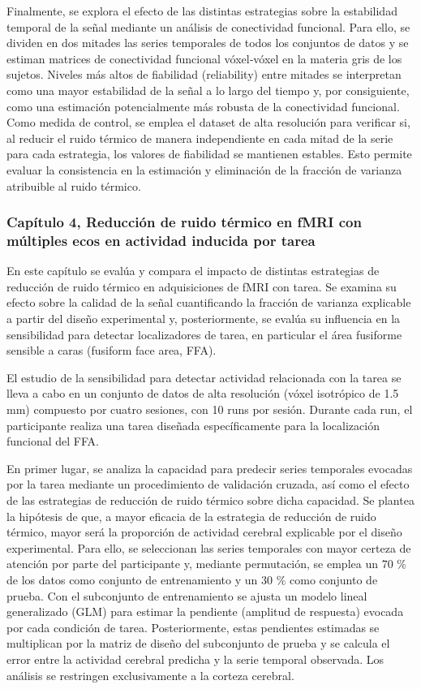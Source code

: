 Finalmente, se explora el efecto de las distintas estrategias sobre la estabilidad temporal de la señal mediante un análisis de conectividad funcional. Para ello, se dividen en dos mitades las series temporales de todos los conjuntos de datos y se estiman matrices de conectividad funcional vóxel‑vóxel en la materia gris de los sujetos. Niveles más altos de fiabilidad (reliability) entre mitades se interpretan como una mayor estabilidad de la señal a lo largo del tiempo y, por consiguiente, como una estimación potencialmente más robusta de la conectividad funcional. Como medida de control, se emplea el dataset de alta resolución para verificar si, al reducir el ruido térmico de manera independiente en cada mitad de la serie para cada estrategia, los valores de fiabilidad se mantienen estables. Esto permite evaluar la consistencia en la estimación y eliminación de la fracción de varianza atribuible al ruido térmico.


\subsubsection{Capítulo 4, Reducción de ruido térmico en fMRI  con múltiples ecos en actividad inducida por tarea}

En este capítulo se evalúa y compara el impacto de distintas estrategias de reducción de ruido térmico en adquisiciones de fMRI con tarea. Se examina su efecto sobre la calidad de la señal cuantificando la fracción de varianza explicable a partir del diseño experimental y, posteriormente, se evalúa su influencia en la sensibilidad para detectar localizadores de tarea, en particular el área fusiforme sensible a caras (fusiform face area, FFA).

El estudio de la sensibilidad para detectar actividad relacionada con la tarea se lleva a cabo en un conjunto de datos de alta resolución (vóxel isotrópico de 1.5 mm) compuesto por cuatro sesiones, con 10 runs por sesión. Durante cada run, el participante realiza una tarea diseñada específicamente para la localización funcional del FFA.

En primer lugar, se analiza la capacidad para predecir series temporales evocadas por la tarea mediante un procedimiento de validación cruzada, así como el efecto de las estrategias de reducción de ruido térmico sobre dicha capacidad. Se plantea la hipótesis de que, a mayor eficacia de la estrategia de reducción de ruido térmico, mayor será la proporción de actividad cerebral explicable por el diseño experimental. Para ello, se seleccionan las series temporales con mayor certeza de atención por parte del participante y, mediante permutación, se emplea un 70 $\%$ de los datos como conjunto de entrenamiento y un 30 $\%$ como conjunto de prueba. Con el subconjunto de entrenamiento se ajusta un modelo lineal generalizado (GLM) para estimar la pendiente (amplitud de respuesta) evocada por cada condición de tarea. Posteriormente, estas pendientes estimadas se multiplican por la matriz de diseño del subconjunto de prueba y se calcula el error entre la actividad cerebral predicha y la serie temporal observada. Los análisis se restringen exclusivamente a la corteza cerebral.

